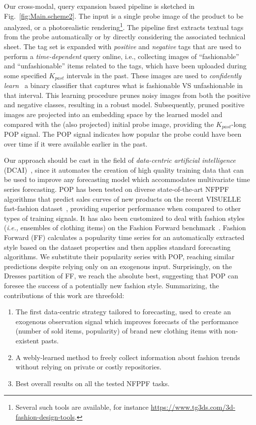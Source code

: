 \documentclass[runningheads]{llncs}
\newcommand{\snamebig}[0] {POP\xspace}
\begin{document}
Our cross-modal, query expansion based pipeline is sketched in Fig.~\ref{fig:Main.scheme2}. The input is a single probe image of the product to be analyzed, or a photorealistic rendering\footnote{Several such tools are available, for instance \url{https://www.tg3ds.com/3d-fashion-design-tools}.}. The pipeline first extracts textual tags from the probe automatically or by directly considering the associated technical sheet. The tag set is expanded with \emph{positive} and \emph{negative} tags that are used to perform a \emph{time-dependent} query online, i.e., collecting images of ``fashionable'' and ``unfashionable'' items related to the tags, which have been uploaded during some specified $K_{past}$ intervals in the past. These images are used to \emph{confidently learn}~\cite{northcutt2021confident} a binary classifier that captures what is fashionable VS unfashionable in that interval. This learning procedure prunes noisy images from both the positive and negative classes, resulting in a robust model. Subsequently, pruned positive images are projected into an embedding space by the learned model and compared with the (also projected) initial probe image, providing the $K_{past}$-long \snamebig signal. The \snamebig signal indicates how popular the probe could have been over time if it were available earlier in the past. 

Our approach should be cast in the field of \emph{data-centric artificial intelligence} (DCAI)~\cite{motamedi2021data}, since it automates the creation of high quality training data that can be used to improve any forecasting model which accommodates multivariate time series forecasting. \snamebig has been tested on diverse state-of-the-art NFPPF algorithms that predict sales curves of new products on the recent VISUELLE fast-fashion dataset~\cite{skenderi2021well}, providing superior performance when compared to other types of training signals. It has also been customized to deal with fashion styles (\textit{i.e.,} ensembles of clothing items) on the Fashion Forward benchmark~\cite{al2017fashion}. Fashion Forward (FF) calculates a popularity time series for an automatically extracted style based on the dataset properties and then applies standard forecasting algorithms. We substitute their popularity series with \snamebig, reaching similar predictions despite relying only on an exogenous input. Surprisingly, on the Dresses partition of FF, we reach the absolute best, suggesting that \snamebig can foresee the success of a potentially new fashion style. Summarizing, the contributions of this work are threefold:
\begin{enumerate}[noitemsep, leftmargin=*]
    \item The first data-centric strategy tailored to forecasting, used to create an exogenous observation signal which improves forecasts of the performance (number of sold items, popularity) of brand new clothing items with non-existent pasts. 
    \item A webly-learned method to freely collect information about fashion trends without relying on private or costly repositories.   
    \item Best overall results on all the tested NFPPF tasks.
\end{enumerate}
\end{document}
